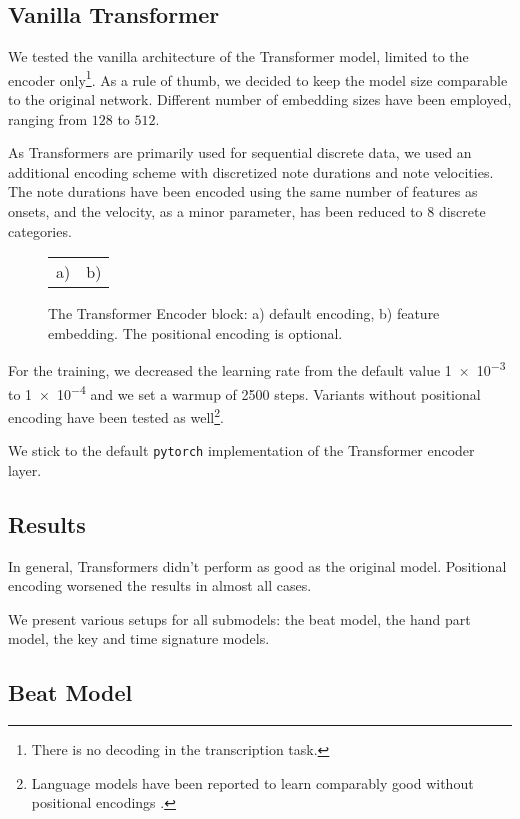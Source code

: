 \subsection{Vanilla Transformer}

We tested the vanilla architecture of the Transformer model, limited to the encoder only\footnote{There is no decoding in the transcription task.}. As a rule of thumb, we decided to keep the model size comparable to the original network. Different number of embedding sizes have been employed, ranging from $128$ to $512$. 

As Transformers are primarily used for sequential discrete data, we used an additional encoding scheme with discretized note durations and note velocities. The note durations have been encoded using the same number of features as onsets, and the velocity, as a minor parameter, has been reduced to 8 discrete categories.

\begin{figure}[ht!]
\centering
\begin{tabular}{cc}a)
 & b)

\end{tabular}
\caption[The Transformer Encoder block.]{The Transformer Encoder block: a) default encoding, b) feature embedding. The positional encoding is optional.}
\end{figure}

For the training, we decreased the learning rate from the default value \num{1e-3} to \num{1e-4} and we set a warmup of 2500 steps. Variants without positional encoding have been tested as well\footnote{Language models have been reported to learn comparably good without positional encodings \cite{Haviv2022}.}.

We stick to the default \texttt{pytorch} implementation of the Transformer encoder layer.

\subsection{Results}

In general, Transformers didn't perform as good as the original model. Positional encoding worsened the results in almost all cases.

We present various setups for all submodels: the beat model, the hand part model, the key and time signature models.

\subsection{Beat Model}


